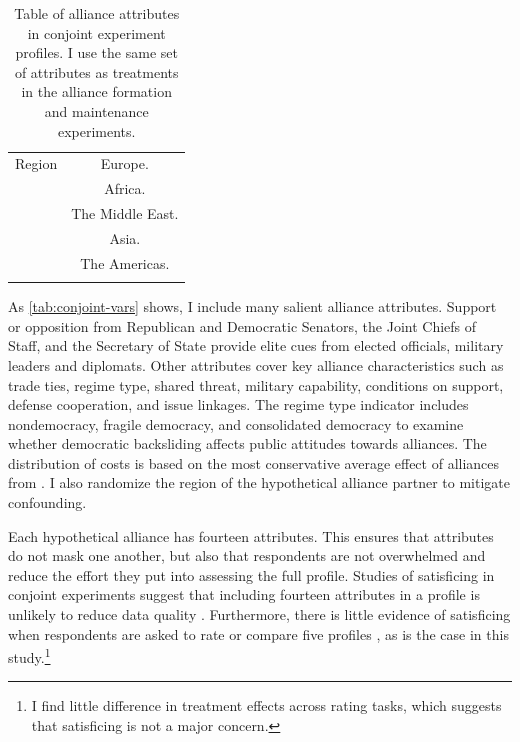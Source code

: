 \documentclass[12pt]{article}
\begin{document}
\begin{table}
\begin{adjustbox}{width = .99\textwidth}
\begin{tabular}{lc}
Region              & Europe. \\ 
                    & Africa. \\
                    & The Middle East. \\ 
                    & Asia. \\   
                    & The Americas. \\ 
                                                                            
\hline \\
\end{tabular}
\end{adjustbox}
\caption{Table of alliance attributes in conjoint experiment profiles. I use the same set of attributes as treatments in the alliance formation and maintenance experiments.} 
\label{tab:conjoint-vars}
\end{table}


As \autoref{tab:conjoint-vars} shows, I include many salient alliance attributes.
Support or opposition from Republican and Democratic Senators, the Joint Chiefs of Staff, and the Secretary of State provide elite cues from elected officials, military leaders and diplomats. 
Other attributes cover key alliance characteristics such as trade ties, regime type, shared threat, military capability, conditions on support, defense cooperation, and issue linkages.
The regime type indicator includes nondemocracy, fragile democracy, and consolidated democracy to examine whether democratic backsliding affects public attitudes towards alliances. 
The distribution of costs is based on the most conservative average effect of alliances from \citet{AlleyFuhrmann2021}. 
I also randomize the region of the hypothetical alliance partner to mitigate confounding.  


Each hypothetical alliance has fourteen attributes.
This ensures that attributes do not mask one another, but also that respondents are not overwhelmed and reduce the effort they put into assessing the full profile.
Studies of satisficing in conjoint experiments suggest that including fourteen attributes in a profile is unlikely to reduce data quality \citep{Bansaketal2019}. 
Furthermore, there is little evidence of satisficing when respondents are asked to rate or compare five profiles \citep{Bansaketal2018}, as is the case in this study.\footnote{I find little difference in treatment effects across rating tasks, which suggests that satisficing is not a major concern.} 
\end{document}
